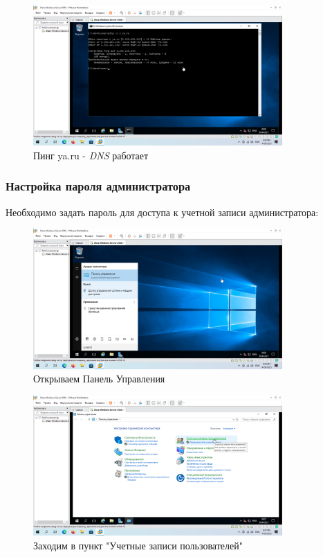\documentclass[a4paper]{article}
\begin{document}
  \begin{figure}[H]
    \centering
    \includegraphics[width=0.85\textwidth]{Screenshot_30}
    \caption{Пинг ya.ru - \textit{DNS} работает}
    \label{img:30}
  \end{figure}

  \subsubsection{Настройка пароля администратора}

  Необходимо задать пароль для доступа к учетной записи администратора:

  \begin{figure}[H]
    \centering
    \includegraphics[width=0.85\textwidth]{Screenshot_31}
    \caption{Открываем Панель Управления}
    \label{img:31}
  \end{figure}

  \begin{figure}[H]
    \centering
    \includegraphics[width=0.85\textwidth]{Screenshot_32}
    \caption{Заходим в пункт "Учетные записи пользователей"}
    \label{img:32}
  \end{figure}
\end{document}
